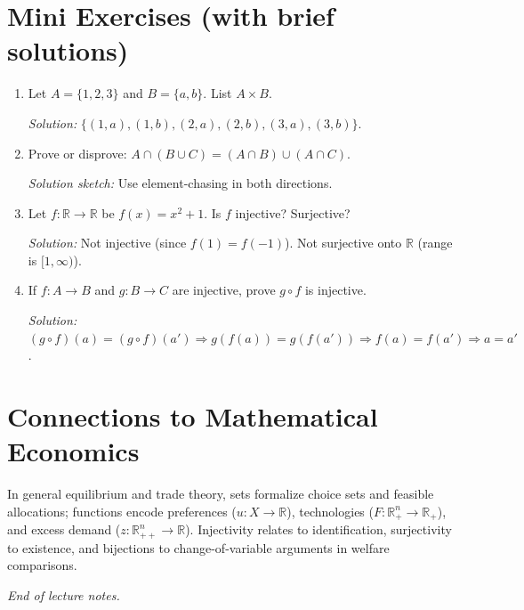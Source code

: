 \documentclass[11pt]{article}
\newcommand{\R}{\mathbb{R}}
\begin{document}
\section{Mini Exercises (with brief solutions)}
\begin{enumerate}[label=\textbf{E\arabic*:},wide]
  \item Let $A=\{1,2,3\}$ and $B=\{a,b\}$. List $A\times B$.
  
  \textit{Solution: } $\{(1,a),(1,b),(2,a),(2,b),(3,a),(3,b)\}$.
  
  \item Prove or disprove: $A\cap (B\cup C)=(A\cap B)\cup(A\cap C)$.
  
  \textit{Solution sketch: } Use element-chasing in both directions.
  
  \item Let $f\colon \R\to\R$ be $f(x)=x^2+1$. Is $f$ injective? Surjective?
  
  \textit{Solution: } Not injective (since $f(1)=f(-1)$). Not surjective onto $\R$ (range is $[1,\infty)$).
  
  \item If $f\colon A\to B$ and $g\colon B\to C$ are injective, prove $g\circ f$ is injective.
  
  \textit{Solution: } $(g\circ f)(a)=(g\circ f)(a')\Rightarrow g(f(a))=g(f(a'))\Rightarrow f(a)=f(a')\Rightarrow a=a'$.
\end{enumerate}

\section{Connections to Mathematical Economics}
In general equilibrium and trade theory, sets formalize choice sets and feasible allocations; functions encode preferences ($u\colon X\to\R$), technologies ($F\colon \R_+^n\to\R_+$), and excess demand ($z\colon \R_{++}^n\to\R$). Injectivity relates to identification, surjectivity to existence, and bijections to change-of-variable arguments in welfare comparisons.

\vfill
\begin{center}
\small\emph{End of lecture notes.}
\end{center}
\end{document}
